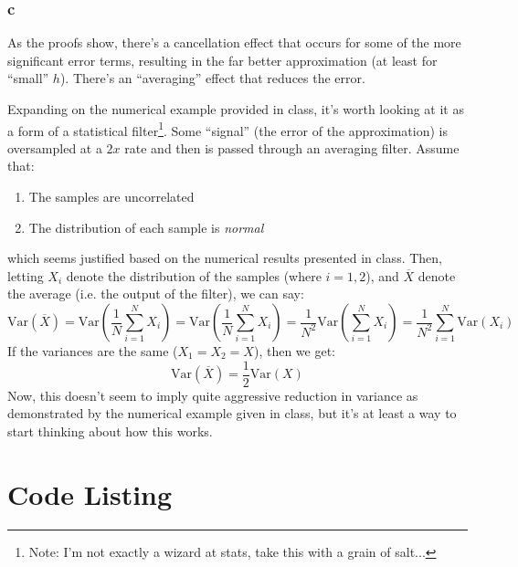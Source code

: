 \documentclass[11pt]{report}
\theoremstyle{definition}
\begin{document}
\subsubsection*{c}
As the proofs show, there's a cancellation effect that occurs for some of the more significant
error terms, resulting in the far better approximation (at least for ``small'' $h$).
There's an ``averaging'' effect that reduces the error.

Expanding on the numerical example provided in class, it's worth
looking at it as a form of a statistical filter\footnote{Note: I'm not
	exactly a wizard at stats, take this with a grain of salt...}. Some
``signal'' (the error of the approximation) is oversampled at a $2x$ rate and then is
passed through an averaging filter. Assume that:
\begin{enumerate}
	\item The samples are uncorrelated
	\item The distribution of each sample is \textit{normal}
\end{enumerate}
which seems justified based on the numerical results presented in class.
Then, letting $X_i$ denote the distribution of the samples (where $i=1,2$), and
$\overline{X}$ denote the average (i.e. the output of the filter), we can say:
\[
	\mathrm{Var}(\overline{X})
	= \mathrm{Var}\left(\frac{1}{N}\sum_{i=1}^N X_i\right)
	= \mathrm{Var}\left(\frac{1}{N}\sum_{i=1}^N X_i\right)
	= \frac{1}{N^2}\mathrm{Var}\left(\sum_{i=1}^N X_i\right)
	= \frac{1}{N^2}\sum_{i=1}^N \mathrm{Var}\left(X_i\right)
\]
If the variances are the same ($X_1 = X_2 = X$), then we get:
\[ \mathrm{Var}(\overline{X}) = \frac{1}{2}\mathrm{Var}(X) \]
Now, this doesn't seem to imply quite aggressive reduction in variance as demonstrated by the numerical example
given in class, but it's at least a way to start thinking about how this works.

\newpage
\section*{Code Listing}
\lstset{style=mystyle}

\end{document}
